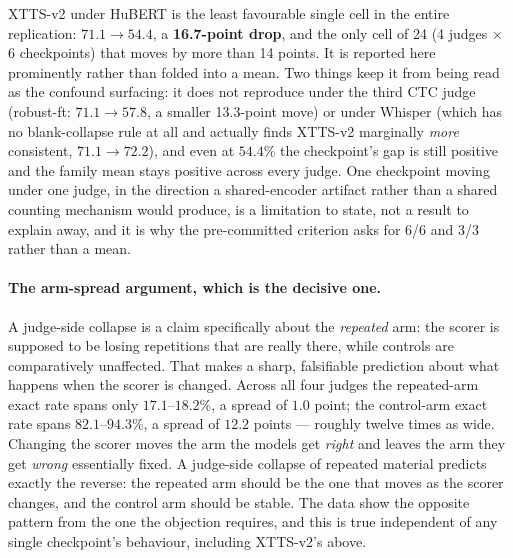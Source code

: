 \documentclass[11pt]{article}
\begin{document}
\noindent XTTS-v2 under HuBERT is the least favourable single cell in the
entire replication: $71.1\to54.4$, a \textbf{16.7-point drop}, and the only
cell of 24 (4 judges $\times$ 6 checkpoints) that moves by more than 14
points. It is reported here prominently rather than folded into a mean. Two
things keep it from being read as the confound surfacing: it does not
reproduce under the third CTC judge (robust-ft: $71.1\to57.8$, a smaller
13.3-point move) or under Whisper (which has no blank-collapse rule at all
and actually finds XTTS-v2 marginally \emph{more} consistent, $71.1\to72.2$),
and even at $54.4\%$ the checkpoint's gap is still positive and the family
mean stays positive across every judge. One checkpoint moving under one
judge, in the direction a shared-encoder artifact rather than a shared
counting mechanism would produce, is a limitation to state, not a result to
explain away, and it is why the pre-committed criterion asks for 6/6 and 3/3
rather than a mean.

\paragraph{The arm-spread argument, which is the decisive one.} A judge-side
collapse is a claim specifically about the \emph{repeated} arm: the scorer is
supposed to be losing repetitions that are really there, while controls are
comparatively unaffected. That makes a sharp, falsifiable prediction about
what happens when the scorer is changed. Across all four judges the
repeated-arm exact rate spans only $17.1$--$18.2\%$, a spread of $1.0$ point;
the control-arm exact rate spans $82.1$--$94.3\%$, a spread of $12.2$
points --- roughly twelve times as wide. Changing the scorer moves the arm the models
get \emph{right} and leaves the arm they get \emph{wrong} essentially fixed.
A judge-side collapse of repeated material predicts exactly the reverse: the
repeated arm should be the one that moves as the scorer changes, and the
control arm should be stable. The data show the opposite pattern from the one
the objection requires, and this is true independent of any single
checkpoint's behaviour, including XTTS-v2's above.
\end{document}
